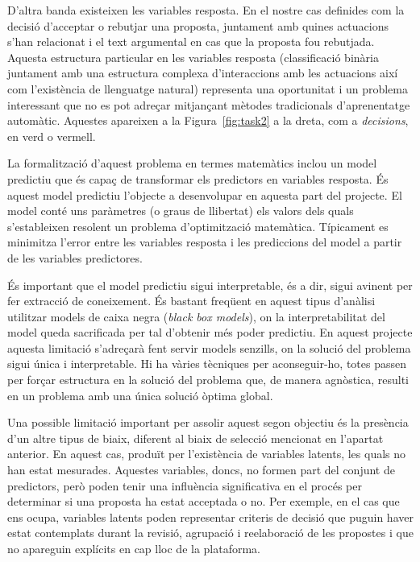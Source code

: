 \documentclass[final,10pt]{article}
\begin{document}
D'altra banda existeixen les variables resposta. En el nostre cas definides com la decisi\'o d'acceptar o rebutjar una proposta, juntament amb quines actuacions s'han relacionat i el text argumental en cas que la proposta fou rebutjada.
Aquesta estructura particular en les variables resposta (classificaci\'o bin\`aria juntament amb una estructura complexa d'interaccions amb les actuacions aix\'i com l'exist\`encia de llenguatge natural) representa una oportunitat i un problema interessant que no es pot adre\c{c}ar mitjan\c{c}ant m\`etodes tradicionals d'aprenentatge autom\`atic.
Aquestes apareixen a la Figura~\ref{fig:task2} a la dreta, com a \emph{decisions}, en verd o vermell.

La formalitzaci\'o d'aquest problema en termes matem\`atics inclou un model predictiu que \'es capa\c{c} de transformar els predictors en variables resposta.
\'Es aquest model predictiu l'objecte a desenvolupar en aquesta part del projecte.
El model cont\'e uns par\`ametres (o graus de llibertat) els valors dels quals s'estableixen resolent un problema d'optimitzaci\'o matem\`atica. T\'ipicament es minimitza l'error entre les variables resposta i les prediccions del model a partir de les variables predictores.

\'Es important que el model predictiu sigui interpretable, \'es a dir, sigui avinent per fer extracci\'o de coneixement.
\'Es bastant freq\"uent en aquest tipus d'an\`alisi utilitzar models de caixa negra (\emph{black box models}), on la interpretabilitat del model queda sacrificada per tal d'obtenir m\'es poder predictiu. 
En aquest projecte aquesta limitaci\'o s'adre\c{c}ar\`a fent servir models senzills, on la soluci\'o del problema sigui \'unica i interpretable. Hi ha v\`aries t\`ecniques per aconseguir-ho, totes passen per for\c{c}ar estructura en la soluci\'o del problema que, de manera agn\`ostica, resulti en un problema amb una \'unica soluci\'o \`optima global.

Una possible limitaci\'o important per assolir aquest segon objectiu \'es la pres\`encia d'un altre tipus de biaix, diferent al biaix de selecci\'o mencionat en l'apartat anterior. En aquest cas, produ\"it per l'exist\`encia de variables latents, les quals no han estat mesurades. Aquestes variables, doncs, no formen part del conjunt de predictors, per\`o poden tenir una influ\`encia significativa en el proc\'es per determinar si una proposta ha estat acceptada o no. Per exemple, en el cas que ens ocupa, variables latents poden representar criteris de decisi\'o que puguin haver estat contemplats durant la revisi\'o, agrupaci\'o i reelaboraci\'o de les propostes i que no apareguin expl\'icits en cap lloc de la plataforma.
\end{document}
